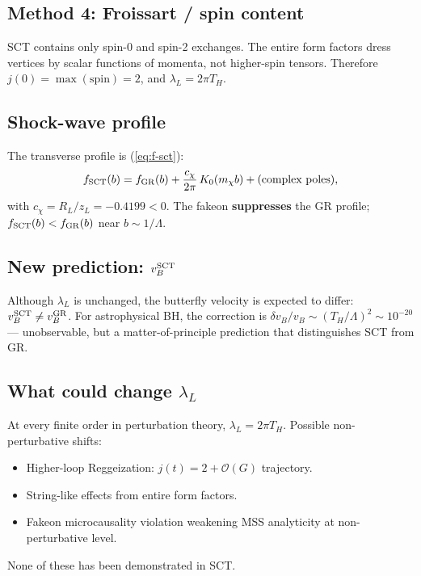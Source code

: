 \documentclass[11pt,a4paper]{article}
\renewcommand{\order}{\mathcal{O}}
\theoremstyle{plain}
\theoremstyle{definition}
\begin{document}
\subsection{Method 4: Froissart / spin content}

SCT contains only spin-0 and spin-2 exchanges.  The entire form
factors dress vertices by scalar functions of momenta, not higher-spin
tensors.  Therefore $j(0) = \max(\text{spin}) = 2$, and $\lambda_L
= 2\pi T_H$.

\subsection{Shock-wave profile}

The transverse profile is (\cref{eq:f-sct}):
\begin{equation}
f_{\rm SCT}(b) = f_{\rm GR}(b) + \frac{c_\chi}{2\pi}\,K_0(m_\chi b)
  + \text{(complex poles)},
\end{equation}
with $c_\chi = R_L/z_L = -0.4199 < 0$.  The fakeon \textbf{suppresses}
the GR profile; $f_{\rm SCT}(b) < f_{\rm GR}(b)$ near $b \sim 1/\Lambda$.

\subsection{New prediction: $v_B^{\rm SCT}$}

Although $\lambda_L$ is unchanged, the butterfly velocity is expected
to differ: $v_B^{\rm SCT} \neq v_B^{\rm GR}$.  For astrophysical BH,
the correction is $\delta v_B / v_B \sim (T_H/\Lambda)^2 \sim 10^{-20}$
--- unobservable, but a matter-of-principle prediction that
distinguishes SCT from GR.

\subsection{What could change $\lambda_L$}

At every finite order in perturbation theory, $\lambda_L = 2\pi T_H$.
Possible non-perturbative shifts:
\begin{itemize}
\item Higher-loop Reggeization: $j(t) = 2 + \order(G)$ trajectory.
\item String-like effects from entire form factors.
\item Fakeon microcausality violation weakening MSS analyticity
      at non-perturbative level.
\end{itemize}
None of these has been demonstrated in SCT.
\end{document}
